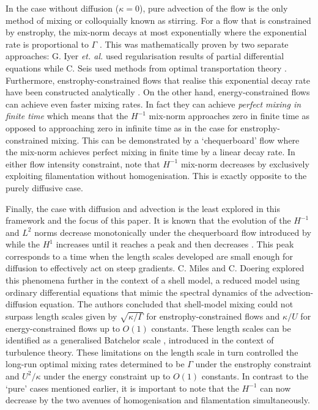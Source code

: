 \documentclass[12pt]{iopart}
\begin{document}
In the case without diffusion ($\kappa = 0$), pure advection of the flow is the only method of mixing or colloquially known as stirring. For a flow that is constrained by enstrophy, the mix-norm decays at most exponentially where the exponential rate is proportional to $\Gamma$ \cite{GI2014,CS2013}. This was mathematically proven by two separate approaches: G. Iyer {\it et. al.} \cite{GI2014} used regularisation results of partial differential equations \cite{Crippa} while C. Seis \cite{CS2013} used methods from optimal transportation theory \cite{villani2003topics}. Furthermore, enstrophy-constrained flows that realise this exponential decay rate have been constructed analytically \cite{Alberti2014a}. On the other hand, energy-constrained flows can achieve even faster mixing rates. In fact they can achieve {\it perfect mixing in finite time} which means that the $H^{-1}$ mix-norm approaches zero in finite time as opposed to approaching zero in infinite time as in the case for enstrophy-constrained mixing. This can be demonstrated by a `chequerboard' flow \cite{JMP2012} where the mix-norm achieves perfect mixing in finite time by a linear decay rate.  In either flow intensity constraint, note that $H^{-1}$ mix-norm decreases by exclusively exploiting filamentation without homogenisation. This is  exactly opposite to the purely diffusive case.

Finally, the case with diffusion and advection is the least explored in this framework and the focus of this paper. 
It is known that the evolution of the $H^{-1}$ and $L^2$ norms decrease monotonically under the chequerboard flow introduced by \cite{JMP2012}
 while the $H^{1}$ increases until it reaches a peak and then decreases \cite{DF2014}. This peak corresponds to a  time when the length scales developed are small enough for diffusion to effectively act on steep gradients. C. Miles and C. Doering \cite{Miles2017a} explored this phenomena further in the context of a shell model, a reduced model using ordinary differential equations that mimic the spectral dynamics of the advection-diffusion equation. The authors concluded that shell-model mixing could not surpass length scales given by $\sqrt{\kappa/ \Gamma}$ for enstrophy-constrained flows and $\kappa/U$ for energy-constrained flows up to $O(1)$ constants. These length scales can be identified as a generalised Batchelor scale \cite{Batchelor1959a}, introduced in the context of turbulence theory. These limitations on the length scale in turn controlled the long-run optimal mixing rates determined to be $\Gamma$ under the enstrophy constraint and $U^2/\kappa$ under the energy constraint up to $O(1)$ constants. In contrast to the `pure' cases mentioned earlier, it is important to note that the $H^{-1}$ can now decrease by the two avenues of homogenisation and filamentation simultaneously. 
\end{document}

